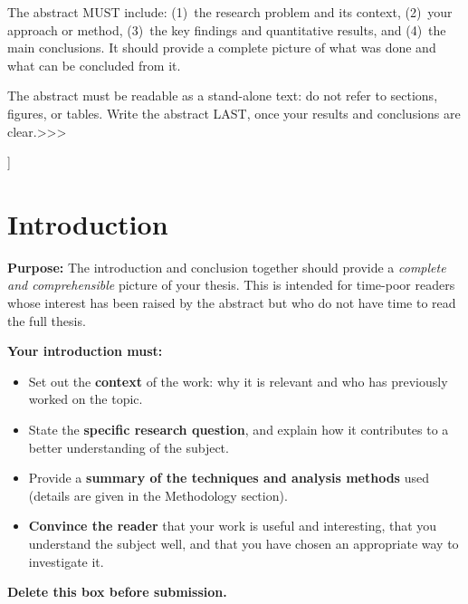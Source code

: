 \documentclass[12pt,a4paper,twocolumn]{article}
\begin{document}
\begin{@twocolumnfalse}
\begin{center}
\begin{minipage}{0.92\textwidth}
      The abstract MUST include: (1)~the research problem and its context,
      (2)~your approach or method, (3)~the key findings and quantitative
      results, and (4)~the main conclusions.  It should provide a complete picture of what was done and what can be concluded from it.

      The abstract must be readable as a stand-alone text: do not refer to
      sections, figures, or tables. Write the abstract LAST, once your
      results and conclusions are clear.>>>

    \end{minipage}

    \vspace{6pt}
  \end{center}

  \end{@twocolumnfalse}
]

\section{Introduction}
\label{sec:introduction}

\begin{guidancebox}
\textbf{Purpose:} The introduction and conclusion together should provide a
\emph{complete and comprehensible} picture of your thesis. This is intended
for time-poor readers whose interest has been raised by the abstract but
who do not have time to read the full thesis.

\textbf{Your introduction must:}
\begin{itemize}[leftmargin=*, nosep]
  \item Set out the \textbf{context} of the work: why it is relevant and
    who has previously worked on the topic.
  \item State the \textbf{specific research question}, and explain how it
    contributes to a better understanding of the subject.
  \item Provide a \textbf{summary of the techniques and analysis methods}
    used (details are given in the Methodology section).
  \item \textbf{Convince the reader} that your work is useful and
    interesting, that you understand the subject well, and that you have
    chosen an appropriate way to investigate it.
\end{itemize}



\textbf{Delete this box before submission.}
\end{guidancebox}
\end{document}
